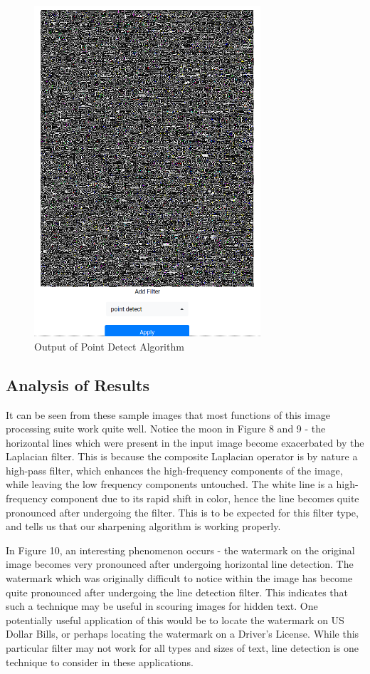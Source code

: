 \documentclass{article}
\let\Oldsubsection\subsection
\renewcommand{\subsection}{\FloatBarrier\Oldsubsection}
\begin{document}
  \begin{figure}[!htb]
    \centering
    \includegraphics[width=0.75\textwidth]{assets/point_detect.png}
    \caption{Output of Point Detect Algorithm}
    \label{fig:point-detect-output}
  \end{figure}
  
  \subsection{Analysis of Results}
  It can be seen from these sample images that most functions of this image processing suite work quite well. Notice the moon in Figure 8 and 9 - the horizontal lines which were present in the input image become exacerbated by the Laplacian filter. This is because the composite Laplacian operator is by nature a high-pass filter, which enhances the high-frequency components of the image, while leaving the low frequency components untouched. The white line is a high-frequency component due to its rapid shift in color, hence the line becomes quite pronounced after undergoing the filter. This is to be expected for this filter type, and tells us that our sharpening algorithm is working properly.
  
  In Figure 10, an interesting phenomenon occurs - the watermark on the original image becomes very pronounced after undergoing horizontal line detection. The watermark which was originally difficult to notice within the image has become quite pronounced after undergoing the line detection filter. This indicates that such a technique may be useful in scouring images for hidden text. One potentially useful application of this would be to locate the watermark on US Dollar Bills, or perhaps locating the watermark on a Driver's License. While this particular filter may not work for all types and sizes of text, line detection is one technique to consider in these applications.
  
\end{document}
